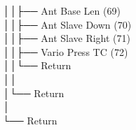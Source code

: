 │\hspace{2em}│\hspace{2em}├── Ant Base Len (69) \\
│\hspace{2em}│\hspace{2em}├── Ant Slave Down (70) \\
│\hspace{2em}│\hspace{2em}├── Ant Slave Right (71) \\
│\hspace{2em}│\hspace{2em}├── Vario Press TC (72) \\
│\hspace{2em}│\hspace{2em}└── Return \\
│\hspace{2em}│\hspace{2em} \\
│\hspace{2em}└── Return \\
│\hspace{2em} \\
└── Return \\
\sffamily

